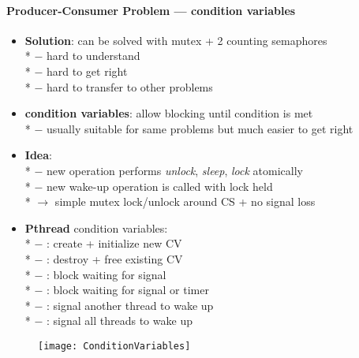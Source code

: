\paragraph{Producer-Consumer Problem --- condition variables}
\begin{itemize}
  \item \textbf{Solution}: can be solved with mutex + 2 counting semaphores \\*
    $ - $ hard to understand \\*
    $ - $ hard to get right \\*
    $ - $ hard to transfer to other problems
  \item \textbf{condition variables}: allow blocking until condition is met \\*
   $ - $ usually suitable for same problems but much easier to get right
  \item \textbf{Idea}: \\*
    $ - $ new operation performs \emph{unlock}, \emph{sleep}, \emph{lock} atomically \\*
    $ - $ new wake-up operation is called with lock held \\*
    $ \to $ simple mutex lock/unlock around CS + no signal loss
  \item \textbf{Pthread} condition variables: \\*
    $ - $ : create + initialize new CV \\*
    $ - $ : destroy + free existing CV \\*
    $ - $ : block waiting for signal \\*
    $ - $ : block waiting for signal or timer \\*
    $ - $  : signal another thread to wake up \\*
    $ - $ : signal all threads to wake up
\end{itemize}
\begin{figure}[h]\centering\label{ConditionVariables}\texttt{[image: ConditionVariables]}\end{figure}

